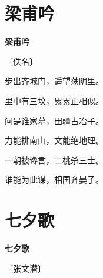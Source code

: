 \documentclass[12pt,UTF-8,openany,fontset=none]{ctexbook}
\begin{document}
\vspace{8pt}
\clearpage

\section{梁甫吟}


\begin{center}
    {\bfseries 梁甫吟}

    \vspace{18pt}

    \begin{large}\xuwen
        〔佚名〕
    \end{large}

\end{center}

    \vspace{18pt}  %

\begin{center}
    \begin{Large}

        步出齐城门，遥望荡阴里。

        里中有三坟，累累正相似。

        问是谁家墓，田疆古冶子。

        力能排南山，文能绝地理。

        一朝被谗言，二桃杀三士。

        谁能为此谋，相国齐晏子。

    \end{Large}

\end{center}

\vspace{8pt}
\clearpage

\section{七夕歌}


\begin{center}
    {\bfseries 七夕歌}

    \vspace{18pt}

    \begin{large}\xuwen
        〔张文潜〕
    \end{large}

\end{center}
\end{document}

